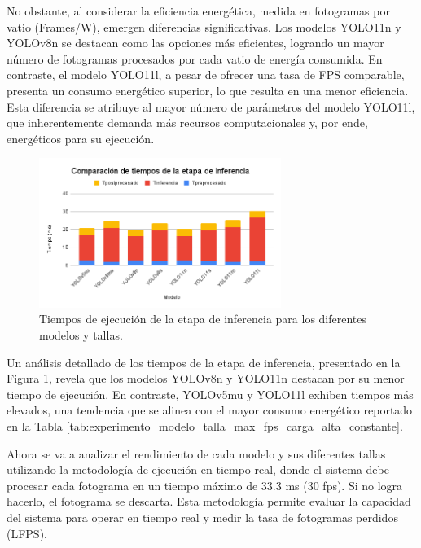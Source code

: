 \documentclass[11pt,spanish,listoffigures,listoftables]{tfgetsinf}
\begin{document}
No obstante, al considerar la eficiencia energética, medida en fotogramas por vatio (Frames/W), emergen diferencias significativas. Los modelos YOLO11n y YOLOv8n se destacan como las opciones más eficientes, logrando un mayor número de fotogramas procesados por cada vatio de energía consumida. En contraste, el modelo YOLO11l, a pesar de ofrecer una tasa de FPS comparable, presenta un consumo energético superior, lo que resulta en una menor eficiencia. Esta diferencia se atribuye al mayor número de parámetros del modelo YOLO11l, que inherentemente demanda más recursos computacionales y, por ende, energéticos para su ejecución.


\begin{figure}[H]
   \centering
   \includegraphics[width=0.7\textwidth]{images/analisis_de_la_solucion/modelo_talla/tiempos_inferencia.png}
   \caption{Tiempos de ejecución de la etapa de inferencia para los diferentes modelos y tallas.}
   \label{fig:tiempos_inferencia}
\end{figure}
Un análisis detallado de los tiempos de la etapa de inferencia, presentado en la Figura \ref{fig:tiempos_inferencia}, revela que los modelos YOLOv8n y YOLO11n destacan por su menor tiempo de ejecución. En contraste, YOLOv5mu y YOLO11l exhiben tiempos más elevados, una tendencia que se alinea con el mayor consumo energético reportado en la Tabla \ref{tab:experimento_modelo_talla_max_fps_carga_alta_constante}.

Ahora se va a analizar el rendimiento de cada modelo y sus diferentes tallas utilizando la metodología de ejecución en tiempo real, donde el sistema debe procesar cada fotograma en un tiempo máximo de 33.3 ms (30 fps). Si no logra hacerlo, el fotograma se descarta. Esta metodología permite evaluar la capacidad del sistema para operar en tiempo real y medir la tasa de fotogramas perdidos (LFPS).
\end{document}

